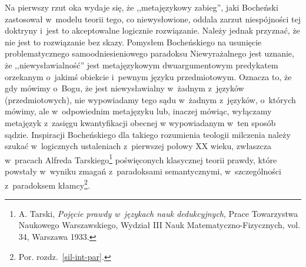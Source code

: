 Na pierwszy rzut oka wydaje się, że ,,metajęzykowy zabieg'', jaki Bocheński zastosował w~modelu teorii tego, co niewysłowione, oddala zarzut niespójności tej doktryny i~jest to akceptowalne logicznie rozwiązanie. Należy jednak przyznać, że nie jest to rozwiązanie bez skazy. Pomysłem Bocheńskiego na usunięcie problematycznego samoodniesieniowego paradoksu Niewyrażalnego jest uznanie, że ,,niewysławialność'' jest metajęzykowym dwuargumentowym predykatem orzekanym o~jakimś obiekcie i~pewnym języku przedmiotowym. Oznacza to, że gdy mówimy o~Bogu, że jest niewysławialny w~żadnym z~języków (przedmiotowych), nie wypowiadamy tego sądu w~żadnym z~języków, o~których mówimy, ale w~odpowiednim metajęzyku lub, inaczej mówiąc, wyłączamy metajęzyk z~zasięgu kwantyfikacji obecnej w wypowiadanym w~ten sposób sądzie. Inspiracji Bocheńskiego dla takiego rozumienia teologii milczenia należy szukać w~logicznych ustaleniach z~pierwszej połowy XX wieku, zwłaszcza w~pracach Alfreda Tarskiego\footnote{A. Tarski, \textit{Pojęcie prawdy w~językach nauk dedukcyjnych}, Prace Towarzystwa Naukowego Warszawskiego, Wydział III Nauk Matematyczno-Fizycznych, vol. 34, Warszawa 1933.} poświęconych klasycznej teorii prawdy, które powstały w~wyniku zmagań z~paradoksami semantycznymi, w~szczególności z~paradoksem kłamcy\footnote{Por. rozdz.~\ref{sil-int-par}.}.

